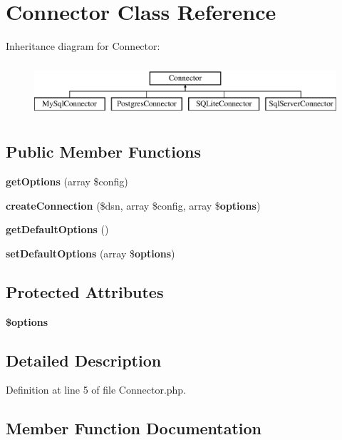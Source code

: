 \section{Connector Class Reference}
\label{class_illuminate_1_1_database_1_1_connectors_1_1_connector}
Inheritance diagram for Connector\+:\begin{figure}[H]
\begin{center}
\leavevmode
\includegraphics[height=2.000000cm]{class_illuminate_1_1_database_1_1_connectors_1_1_connector}
\end{center}
\end{figure}
\subsection*{Public Member Functions}
\begin{DoxyCompactItemize}
\item 
{\bf get\+Options} (array \$config)
\item 
{\bf create\+Connection} (\$dsn, array \$config, array \${\bf options})
\item 
{\bf get\+Default\+Options} ()
\item 
{\bf set\+Default\+Options} (array \${\bf options})
\end{DoxyCompactItemize}
\subsection*{Protected Attributes}
\begin{DoxyCompactItemize}
\item 
{\bf \$options}
\end{DoxyCompactItemize}


\subsection{Detailed Description}


Definition at line 5 of file Connector.\+php.



\subsection{Member Function Documentation}
